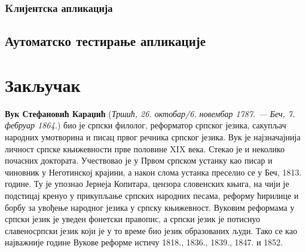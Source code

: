 \documentclass[12pt,oneside]{memoir}
\begin{document}
\newpage


\subsection{Kлијентска апликација}





\section{Аутоматско тестирање апликације}


\chapter{Закључак}


\literatura

\backmatter

\begin{biografija}
\textbf{Вук Стефановић Караџић} (\emph{Тршић, 26. октобар/6. новембар
  1787. — Беч, 7. фебруар 1864.}) био је српски филолог, реформатор
српског језика, сакупљач народних умотворина и писац првог речника
српског језика.  Вук је најзначајнија личност српске књижевности прве
половине XIX века. Стекао је и неколико почасних доктората.
Учествовао је у Првом српском устанку као писар и чиновник у
Неготинској крајини, а након слома устанка преселио се у Беч,
1813. године. Ту је упознао Јернеја Копитара, цензора словенских
књига, на чији је подстицај кренуо у прикупљање српских народних
песама, реформу ћирилице и борбу за увођење народног језика у српску
књижевност. Вуковим реформама у српски језик је уведен фонетски
правопис, а српски језик је потиснуо славеносрпски језик који је у то
време био језик образованих људи. Тако се као најважније године Вукове
реформе истичу 1818., 1836., 1839., 1847. и 1852.
\end{biografija}
\end{document}
